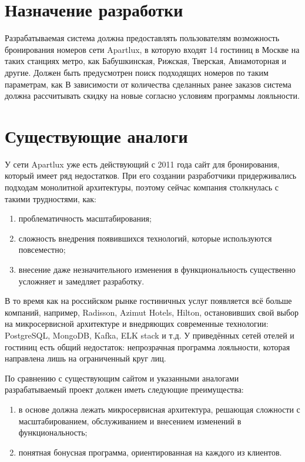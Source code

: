 \section*{Назначение разработки}
Разрабатываемая система должна предоставлять пользователям возможность бронирования номеров сети Apartlux, в которую входят 14 гостиниц в Москве на таких станциях метро, как Бабушкинская, Рижская, Тверская, Авиамоторная и другие. Должен быть предусмотрен поиск подходящих номеров по таким параметрам, как  В зависимости от количества сделанных ранее заказов система должна рассчитывать скидку на новые согласно условиям программы лояльности.

\section*{Существующие аналоги}
У сети Apartlux уже есть действующий с 2011 года сайт для бронирования, который имеет ряд недостатков. При его создании разработчики придерживались подходам монолитной архитектуры, поэтому сейчас компания столкнулась с такими трудностями, как:
\begin{enumerate}
	\item проблематичность масштабирования;
	
	\item сложность внедрения появившихся технологий, которые используются повсеместно;
	
	\item внесение даже незначительного изменения в функциональность существенно усложняет и замедляет разработку.
\end{enumerate}

В то время как на российском рынке гостиничных услуг появляется всё больше компаний, например, Radisson, Azimut Hotels, Hilton, остановивших свой выбор на микросервисной архитектуре и внедряющих современные технологии: PostgreSQL, MongoDB, Kafka, ELK stack и т.д. У приведённых сетей отелей и гостиниц есть общий недостаток: непрозрачная программа лояльности, которая направлена лишь на ограниченный круг лиц.

По сравнению с существующим сайтом и указанными аналогами разрабатываемый проект должен иметь следующие преимущества:
\begin{enumerate}
	\item в основе должна лежать микросервисная архитектура, решающая сложности с масштабированием, обслуживанием и внесением изменений в функциональность;
	
	\item понятная бонусная программа, ориентированная на каждого из клиентов.
\end{enumerate}

